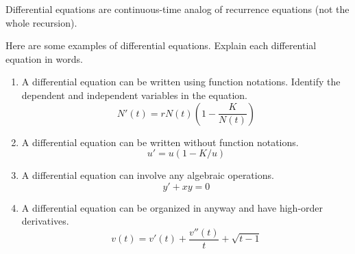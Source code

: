 \documentclass[../main.tex]{subfiles}
\begin{document}
\faStar{} Differential equations are continuous-time analog of recurrence equations (not the whole recursion).  

\begin{example}
  Here are some examples of differential equations.  Explain each differential equation in words.

  \begin{enumerate}[wide]
    \item A differential equation can be written using function notations. Identify the dependent and independent variables in the equation.
      \begin{equation}
        N'(t) = r N(t) \left(1-\frac{K}{N(t)}\right)
      \end{equation}

    \item A differential equation can be written without function notations.
      \begin{equation}
        u' = u (1-K/u)
      \end{equation}

    \item A differential equation can involve any algebraic operations.
      \begin{equation}
        y' + xy = 0
      \end{equation}

    \item A differential equation can be organized in anyway and have high-order derivatives.
      \begin{equation}
        v(t) = v'(t) + \frac{v''(t)}{t} + \sqrt{t-1}
      \end{equation}
  \end{enumerate}
\end{example}
\end{document}
